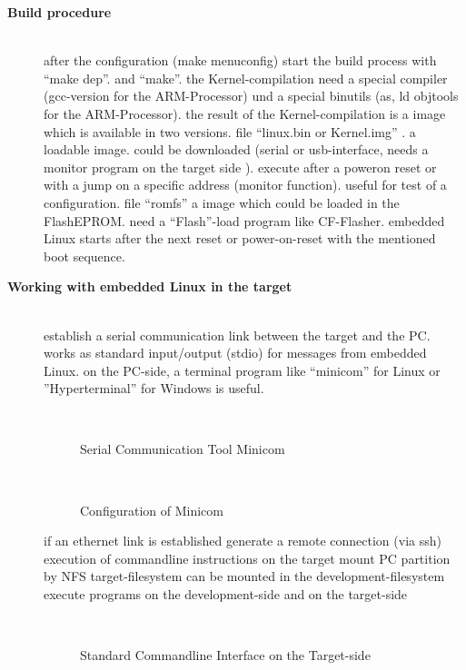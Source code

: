 \begin{description}
\item[{\rot\bf Build procedure}]~\\[-3ex]
\bi
	\ite after the configuration (make menuconfig)
	\bi
		\ite start the build process with ``make dep''.
		\ite  and ``make''.
	\ei
	\bigskip
	\ite the Kernel-compilation need a special compiler (gcc-version for the ARM-Processor) und a special binutils (as, ld objtools for the ARM-Processor).
	\ite the result of the Kernel-compilation is a image which is available in two versions.
	\bi
		\ite file ``linux.bin or Kernel.img'' .
		\bi
			\ite a loadable image.
			\ite could be downloaded (serial or usb-interface, needs a monitor program on the target side ).
			\ite execute after a poweron reset or with a jump on a specific address (monitor function).
			\ite useful for test of a configuration.
		\ei
		\bigskip
		\ite file ``romfs''
		\bi
  			\ite a image which could be loaded in the FlashEPROM.
			\ite need a ``Flash''-load program like CF-Flasher.
			\ite embedded Linux starts after the next reset or power-on-reset with the mentioned boot sequence.
		\ei
	\ei
\ei

\item[{\rot\bf Working with embedded Linux in the target}]~\\[-3ex]

\bi
	\ite establish a serial communication link between the target and the PC.
	\bi
		\ite works as standard input/output (stdio) for messages from embedded Linux.
		\ite on the PC-side, a terminal program like ``minicom''  for Linux or ''Hyperterminal'' for Windows is useful.
	\ei
\ei
\os{\newpage}
\begin{figure}[!hbtp]
     \begin{center}
	  \\
	  \caption{Serial Communication Tool Minicom}
     \end{center}
\end{figure}

\os{\newpage}
\begin{figure}[!hbtp]
     \begin{center}
	  \\
	  \caption{Configuration of Minicom}
     \end{center}
\end{figure}

\os{\newpage}
\bi
	\ite if an ethernet link is established
	\bi
	  \ite generate a remote connection (via ssh)
	  \bi
	    \ite execution of commandline instructions on the target
	  \ei
	  \ite mount PC partition by NFS
	  \bi
	    \ite target-filesystem can be mounted in the development-filesystem
	    \ite execute programs on the development-side and on the target-side
	  \ei
	\ei
\ei
\begin{figure}[!hbtp]
     \begin{center}
	  \\
	  \caption{Standard Commandline Interface on the Target-side}
     \end{center}
\end{figure}


\end{description}
